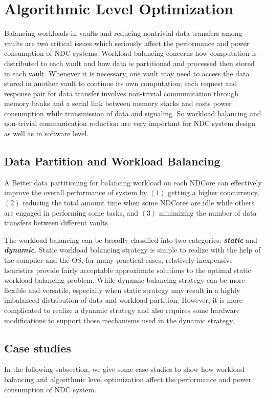 \documentclass[letterpaper, 11pt, conference, margin=1in]{ieeeconf}   %
\begin{document}
\section{Algorithmic Level Optimization}
Balancing workloads in vaults and reducing nontrivial data transfers among vaults are two critical issues which seriously affect the performance and power consumption of NDC systems. Workload balancing concerns how computation is distributed to each vault and how data is partitioned and processed then stored in each vault. Whenever it is necessary, one vault may need to access the data stored in another vault to continue its own computation; each request and response pair for data transfer involves non-trivial communication through memory banks and a serial link between memory stacks and costs power consumption while transmission of data and signaling. So workload balancing and non-trivial communication reduction are very important for NDC system design as well as in software level.
\subsection{Data Partition and Workload Balancing}
A Better data partitioning for balancing workload on each NDCore can effectively improve the overall performance of system by $\left(1\right)$ getting a higher concurrency, $\left(2\right)$ reducing the total amount time when some NDCores are idle while others are engaged in performing some tasks, and $\left(3\right)$ minimizing the number of data transfers between different vaults.

The workload balancing can be broadly classified into two categories: \textbf{\textit{static}} and \textbf{\textit{dynamic}}. Static workload balancing strategy is simple to realize with the help of the compiler and the OS, for many practical cases, relatively inexpensive heuristics provide fairly acceptable approximate solutions to the optimal static workload balancing problem. While dynamic balancing strategy can be more flexible and versatile, especially when static strategy may result in a highly imbalanced distribution of data and workload partition. However, it is more complicated to realize a dynamic strategy and also requires some hardware modifications to support those mechanisms used in the dynamic strategy.

\subsection{\bf Case studies}
In the following subsection, we give some case studies to show how workload balancing and algorithmic level optimization affect the performance and power consumption of NDC system.
\end{document}
